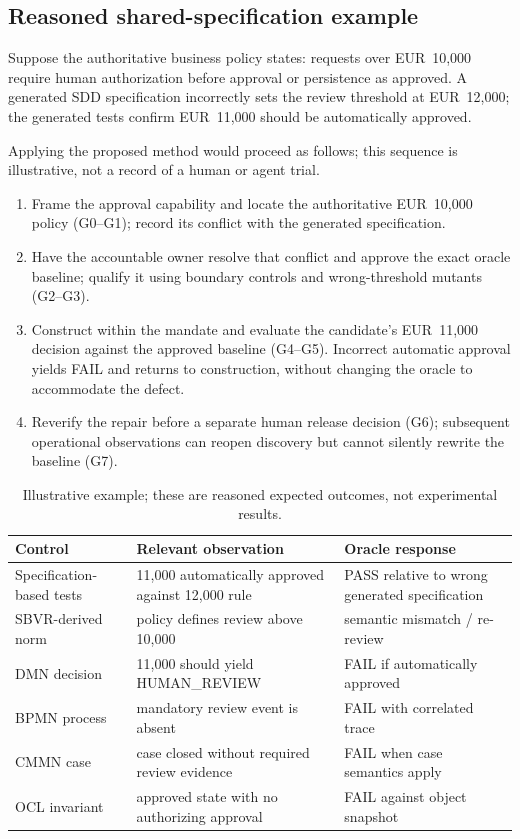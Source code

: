 \documentclass[11pt,a4paper]{article}
\newcommand{\PASS}{\textsf{PASS}}
\newcommand{\FAIL}{\textsf{FAIL}}
\begin{document}
\subsection{Reasoned shared-specification example}
Suppose the authoritative business policy states: requests over EUR~10,000 require human authorization before approval or persistence as approved. A generated SDD specification incorrectly sets the review threshold at EUR~12,000; the generated tests confirm EUR~11,000 should be automatically approved.

Applying the proposed method would proceed as follows; this sequence is illustrative, not a record of a human or agent trial.
\begin{enumerate}
\item Frame the approval capability and locate the authoritative EUR~10,000 policy (G0--G1); record its conflict with the generated specification.
\item Have the accountable owner resolve that conflict and approve the exact oracle baseline; qualify it using boundary controls and wrong-threshold mutants (G2--G3).
\item Construct within the mandate and evaluate the candidate's EUR~11,000 decision against the approved baseline (G4--G5). Incorrect automatic approval yields \FAIL{} and returns to construction, without changing the oracle to accommodate the defect.
\item Reverify the repair before a separate human release decision (G6); subsequent operational observations can reopen discovery but cannot silently rewrite the baseline (G7).
\end{enumerate}

\begin{table}[htbp]
\centering\small
\caption{Illustrative example; these are reasoned expected outcomes, not experimental results.}
\begin{tabularx}{\linewidth}{@{}p{32mm}X X@{}}
\toprule
Control & Relevant observation & Oracle response \\
\midrule
Specification-based tests & 11,000 automatically approved against 12,000 rule & \PASS{} relative to wrong generated specification \\
SBVR-derived norm & policy defines review above 10,000 & semantic mismatch / re-review \\
DMN decision & 11,000 should yield \textsf{HUMAN\_REVIEW} & \FAIL{} if automatically approved \\
BPMN process & mandatory review event is absent & \FAIL{} with correlated trace \\
CMMN case & case closed without required review evidence & \FAIL{} when case semantics apply \\
OCL invariant & approved state with no authorizing approval & \FAIL{} against object snapshot \\
\bottomrule
\end{tabularx}
\label{tab:example}
\end{table}
\end{document}
